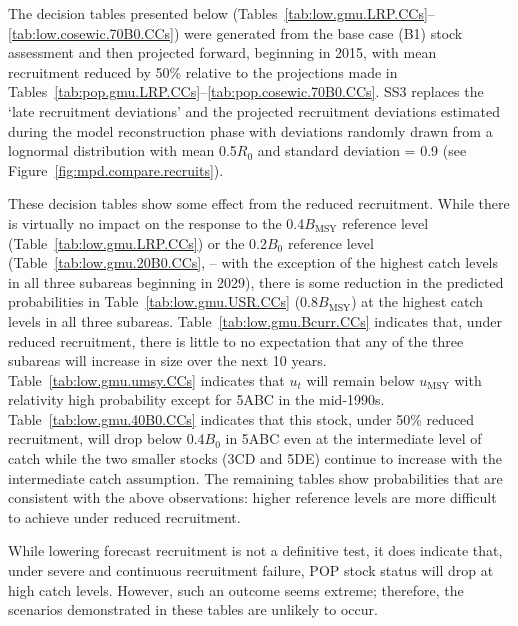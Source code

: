 \documentclass[11pt]{book}
\newcommand{\Bmsy}{B_\text{MSY}}
\newcommand{\umsy}{u_\text{MSY}}
\newcommand{\pc}{\%}
\begin{document}
The decision tables presented below (Tables~\ref{tab:low.gmu.LRP.CCs}--\ref{tab:low.cosewic.70B0.CCs}) were generated from the base case (B1) stock assessment and then projected forward, beginning in 2015, with mean recruitment reduced by 50\pc{} relative to the projections made in Tables~\ref{tab:pop.gmu.LRP.CCs}--\ref{tab:pop.cosewic.70B0.CCs}. 
SS3 replaces the `late recruitment deviations' and the projected recruitment deviations estimated during the model reconstruction phase with deviations randomly drawn from a lognormal distribution with mean 0.5$R_0$ and standard deviation = 0.9 (see Figure~\ref{fig:mpd.compare.recruits}).

These decision tables show some effect from the reduced recruitment.
While there is virtually no impact on the response to the 0.4$\Bmsy$ reference level (Table~\ref{tab:low.gmu.LRP.CCs}) or the 0.2$B_0$ reference level (Table~\ref{tab:low.gmu.20B0.CCs}, -- with the exception of the highest catch levels in all three subareas beginning in 2029), there is some reduction in the predicted probabilities in Table~\ref{tab:low.gmu.USR.CCs} (0.8$\Bmsy$) at the highest catch levels in all three subareas.
Table~\ref{tab:low.gmu.Bcurr.CCs} indicates that, under reduced recruitment, there is little to no expectation that any of the three subareas will increase in size over the next 10 years. 
Table~\ref{tab:low.gmu.umsy.CCs} indicates that $u_t$ will remain below $\umsy$ with relativity high probability except for 5ABC in the mid-1990s. 
Table~\ref{tab:low.gmu.40B0.CCs} indicates that this stock, under 50\pc{} reduced recruitment, will drop below 0.4$B_0$ in 5ABC even at the intermediate level of catch while the two smaller stocks (3CD and 5DE) continue to increase with the intermediate catch assumption.
The remaining tables show probabilities that are consistent with the above observations: higher reference levels are more difficult to achieve under reduced recruitment.

While lowering forecast recruitment is not a definitive test, it does indicate that, under severe and continuous recruitment failure, POP stock status will drop at high catch levels.
However, such an outcome seems extreme; therefore, the scenarios demonstrated in these tables are unlikely to occur.

\setlength{\tabcolsep}{0pt}%
\renewcommand*{\arraystretch}{1.0}
\end{document}

